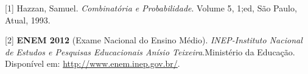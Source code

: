 \documentclass[12pt,a4paper,oneside,openany]{book}
\begin{document}
\begin{thebibliography}{99}
\thispagestyle{empty}%
[1] {Hazzan, Samuel}.
\emph{Combinatória e Probabilidade}.
{Volume  5}, {1;ed}, {São Paulo}, {Atual}, {1993}.

[2] \textbf{ENEM 2012}
(Exame Nacional do Ensino Médio).
\emph{INEP-Instituto Nacional de Estudos e Pesquisas Educacionais Anísio Teixeira}.{Ministério da Educação}. 
Disponível em:
\url{http://www.enem.inep.gov.br/}.
\end{thebibliography}
\end{document}
